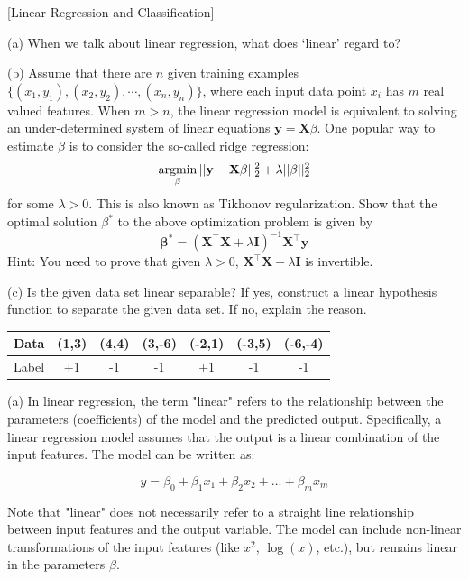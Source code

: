 \item {} [Linear Regression and Classification]

(a) When we talk about linear regression, what does `linear' regard to? 

(b) Assume that there are $n$ given training examples $\{(x_1, y_1), (x_2, y_2), \cdots, (x_n, y_n)\}$, where each input data point $x_i$ has $m$ real valued features. When $m > n$, the linear regression model is equivalent to solving an under-determined system of linear equations $\mathbf{y} = \mathbf{X}\beta$. One popular way to estimate $\beta$ is to consider the so-called ridge regression:
$$\mathop{\rm argmin}_{\beta} ||\mathbf{y}-\mathbf{X}\mathbf{\beta}||_2^2 + \lambda||\beta||_2^2$$
for some $\lambda > 0$. This is also known as Tikhonov regularization. Show that the optimal solution $\beta^*$ to the above optimization problem is given by
$$\mathbf{\beta}^* = (\mathbf{X}^{\top}\mathbf{X} + \lambda \mathbf{I})^{-1}\mathbf{X}^{\top}\mathbf{y}$$
Hint: You need to prove that given $\lambda>0$, $\mathbf{X}^{\top}\mathbf{X} + \lambda \mathbf{I}$ is invertible. 

(c) Is the given data set linear separable? If yes, construct a linear hypothesis function to separate the given data set. If no, explain the reason. 
\begin{table}[h]
    \centering
    \begin{tabular}{c|cccccc}
        Data & (1,3) & (4,4) & (3,-6) & (-2,1) & (-3,5) & (-6,-4) \\ \hline
        Label & +1 & -1 & -1 & +1 & -1 & -1
    \end{tabular}
    \label{tab:my_label}
\end{table}


\solution

(a) In linear regression, the term "linear" refers to the relationship between the parameters (coefficients) of the model and the predicted output. Specifically, a linear regression model assumes that the output is a linear combination of the input features. The model can be written as:

$$y = \beta_0 + \beta_1 x_1 + \beta_2 x_2 + ... + \beta_m x_m$$

Note that "linear" does not necessarily refer to a straight line relationship between input features and the output variable. The model can include non-linear transformations of the input features (like $x^2$, $\log(x)$, etc.), but remains linear in the parameters $\beta$.

